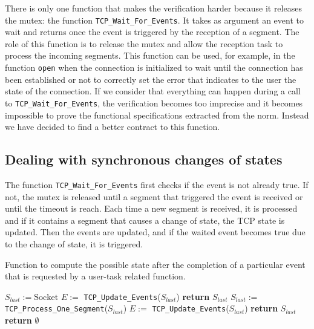 \documentclass[conference]{IEEEtran}
\def\spark#1{\lstinline[language=Ada]{#1}}
\begin{document}
There is only one function that makes the verification harder because it
releases the mutex: the function \spark{TCP_Wait_For_Events}.
It takes as argument an event to wait and returns once the event
is triggered by the reception of a segment.
The role of this
function is to release the mutex and allow the reception task to process the
incoming segments. This function
can be used, for example, in the function \spark{open} when the connection
is initialized to wait until the connection has been established or not to
correctly set the error that indicates to the user the state of the connection.
If we consider that everything can happen during a call to \spark{TCP_Wait_For_Events},
the verification becomes too imprecise and it becomes impossible to prove the
functional specifications extracted from the norm. Instead we have decided to
find a better contract to this function.

\subsection{Dealing with synchronous changes of states}

The function \spark{TCP_Wait_For_Events} first checks if the event is not already
true. If not, the mutex is released until a segment that triggered the event is
received or until the timeout is reach. Each time a new segment is received, it
is processed and if it contains a segment that causes a change of state, the TCP
state is updated. Then the events are updated, and if the waited event becomes
true due to the change of state, it is triggered.

\begin{algorithm}[t]
    \caption{Function to compute the possible state after the completion of a
particular event that is requested by a user-task related function.}
\label{algo:waitForEvents}
\begin{algorithmic}[1]
\footnotesize
{}
    \State $S_{last} := \text{Socket}$
    \State $E :=$ \spark{TCP_Update_Events}($S_{last}$)
        \State \textbf{return}  $S_{last}$
    \EndIf
        \State $S_{last} :=$ \spark{TCP_Process_One_Segment}($S_{last}$)
        \State $E :=$ \spark{TCP_Update_Events}($S_{last}$)
            \State \textbf{return} $S_{last}$
        \EndIf
    \EndFor
    \State \textbf{return} $\emptyset$
\EndFunction
\end{algorithmic}
\end{algorithm}
\end{document}
